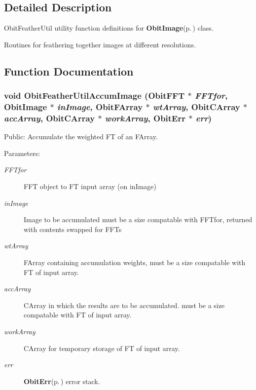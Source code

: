 \subsection{Detailed Description}
Obit\-Feather\-Util utility function definitions for {\bf Obit\-Image}{\rm (p.\,\pageref{structObitImage})} class. 

Routines for feathering together images at different resolutions.

\subsection{Function Documentation}
\subsubsection{\setlength{\rightskip}{0pt plus 5cm}void Obit\-Feather\-Util\-Accum\-Image ({\bf Obit\-FFT} $\ast$ {\em FFTfor}, {\bf Obit\-Image} $\ast$ {\em in\-Image}, {\bf Obit\-FArray} $\ast$ {\em wt\-Array}, {\bf Obit\-CArray} $\ast$ {\em acc\-Array}, {\bf Obit\-CArray} $\ast$ {\em work\-Array}, {\bf Obit\-Err} $\ast$ {\em err})}\label{ObitFeatherUtil_8c_a9}


Public: Accumulate the weighted FT of an FArray. 

\begin{Desc}
\item[Parameters:]
\begin{description}
\item[{\em FFTfor}]FFT object to FT input array (on in\-Image) \item[{\em in\-Image}]Image to be accumulated must be a size compatable with FFTfor, returned with contents swapped for FFTs \item[{\em wt\-Array}]FArray containing accumulation weights, must be a size compatable with FT of input array. \item[{\em acc\-Array}]CArray in which the results are to be accumulated. must be a size compatable with FT of input array. \item[{\em work\-Array}]CArray for temporary storage of FT of input array. \item[{\em err}]{\bf Obit\-Err}{\rm (p.\,\pageref{structObitErr})} error stack. \end{description}
\end{Desc}
